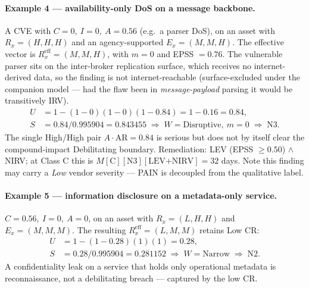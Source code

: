 \documentclass[11pt]{article}
\begin{document}
\paragraph{Example 4 --- availability-only DoS on a message backbone.}
A CVE with $C\!=\!0,\ I\!=\!0,\ A\!=\!0.56$ (e.g.\ a parser DoS), on an asset with
$R_x=(H,H,H)$ and an agency-supported $E_x=(M,M,H)$. The effective vector is
$R_x^{\mathrm{eff}}=(M,M,H)$, with $m=0$ and EPSS $=0.76$. The vulnerable parser sits on the
inter-broker replication surface, which receives no internet-derived data, so the
finding is not internet-reachable (surface-excluded under the companion model ---
had the flaw been in \emph{message-payload} parsing it would be transitively IRV).
\begin{align*}
U &= 1-(1-0)(1-0)(1-0.84) = 1-0.16 = 0.84, \\
S &= 0.84/0.995904 = 0.843455 \;\Rightarrow\; W=\text{Disruptive},\ m=0 \;\Rightarrow\; \boxed{\text{N3}}.
\end{align*}
The single High/High pair $A\!\cdot\!\mathrm{AR}=0.84$ is serious but does not by
itself clear the compound-impact Debilitating boundary.
Remediation: LEV (EPSS $\ge 0.50$) $\land$ NIRV; at Class C this is
$M[\text{C}][\text{N3}][\text{LEV+NIRV}] = 32$ days. Note this finding may carry a
\emph{Low} vendor severity --- PAIN is decoupled from the qualitative label.

\paragraph{Example 5 --- information disclosure on a metadata-only service.}
$C\!=\!0.56,\ I\!=\!0,\ A\!=\!0$, on an asset with
$R_x=(L,H,H)$ and $E_x=(M,M,M)$. The resulting
$R_x^{\mathrm{eff}}=(L,M,M)$ retains Low CR:
\begin{align*}
U &= 1-(1-0.28)(1)(1) = 0.28, \\
S &= 0.28/0.995904 = 0.281152 \;\Rightarrow\; W=\text{Narrow} \;\Rightarrow\; \boxed{\text{N2}}.
\end{align*}
A confidentiality leak on a service that holds only operational metadata is
reconnaissance, not a debilitating breach --- captured by the low CR.
\end{document}
